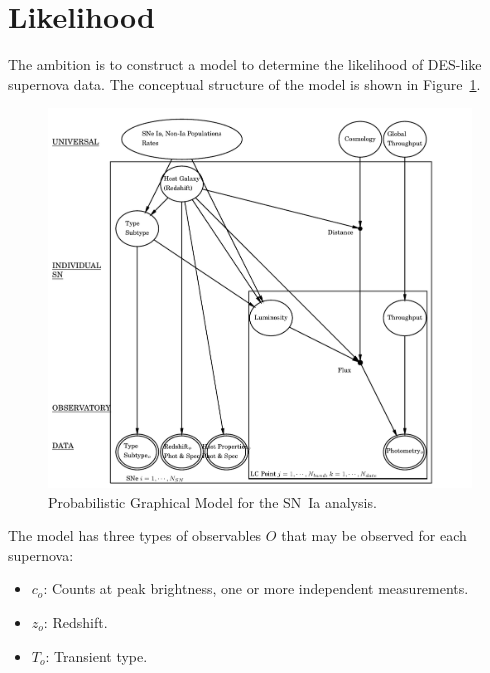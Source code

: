 \documentclass[preprint,3p]{elsarticle}
\begin{document}
%
%

\section{Likelihood}
\label{likelihood:sec}

The ambition is to construct a model to determine the likelihood of DES-like
supernova data. 
The conceptual structure of the model is shown in Figure~\ref{pgm:fig}. 
\begin{figure}[htbp] %
   \centering
   \includegraphics[width=6.5in]{../results//hdpgm.pdf} 
   \caption{Probabilistic Graphical Model for the SN~Ia analysis.  
   \label{pgm:fig}}
\end{figure}

The model has three types of observables $O$ that
may be observed for each supernova:
\begin{itemize}
\item $c_o$: Counts at peak brightness, one or more independent measurements.
\item $z_o$: Redshift.
\item $T_o$: Transient type.
\end{itemize}
\end{document}
